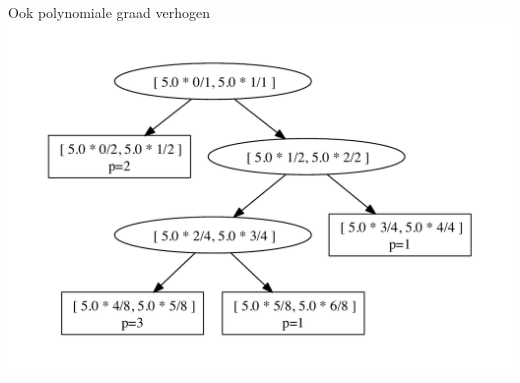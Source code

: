 \documentclass{beamer}
\begin{document}
\begin{frame}{Ook polynomiale graad verhogen}
{  \includegraphics[height=0.5\textheight]{tree_hp_6.pdf}}

\end{frame}
\end{document}
